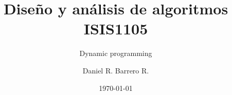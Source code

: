 \title{Diseño y análisis de algoritmos\\ ISIS1105}
\subtitle{Dynamic programming}
\author{Daniel R. Barrero R.}
\date{\today}

